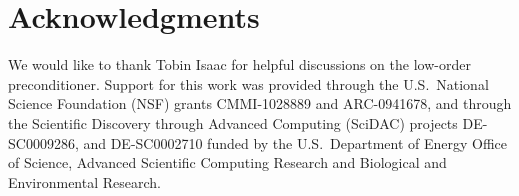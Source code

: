 \documentclass[smallcondensed,final]{svjour3}     %
\begin{document}
\section*{Acknowledgments}
We would like to thank Tobin Isaac for helpful discussions on the
low-order preconditioner. Support for this work was
  provided through the U.S.~National Science Foundation (NSF) grants
  CMMI-1028889 and   %
  ARC-0941678,       %
 and through the Scientific Discovery through Advanced
  Computing (SciDAC) projects 
  DE-SC0009286,   %
  and DE-SC0002710 %
  funded by the U.S.~Department of Energy
  Office of Science, Advanced Scientific Computing Research and
  Biological and Environmental Research.




\end{document}

